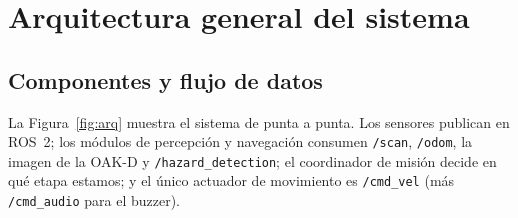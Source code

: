 \documentclass[11pt,a4paper]{article}
\newcommand{\cmd}[1]{\texttt{\small #1}}
\begin{document}
\section{Arquitectura general del sistema}
\label{sec:arq}
\subsection{Componentes y flujo de datos}
La Figura~\ref{fig:arq} muestra el sistema de punta a punta. Los sensores publican en ROS~2; los m\'odulos de percepci\'on y navegaci\'on consumen
\cmd{/scan}, \cmd{/odom}, la imagen de la OAK-D y \cmd{/hazard\_detection}; el coordinador de misi\'on decide en qu\'e etapa estamos; y el \'unico
actuador de movimiento es \cmd{/cmd\_vel} (m\'as \cmd{/cmd\_audio} para el buzzer).
\end{document}
